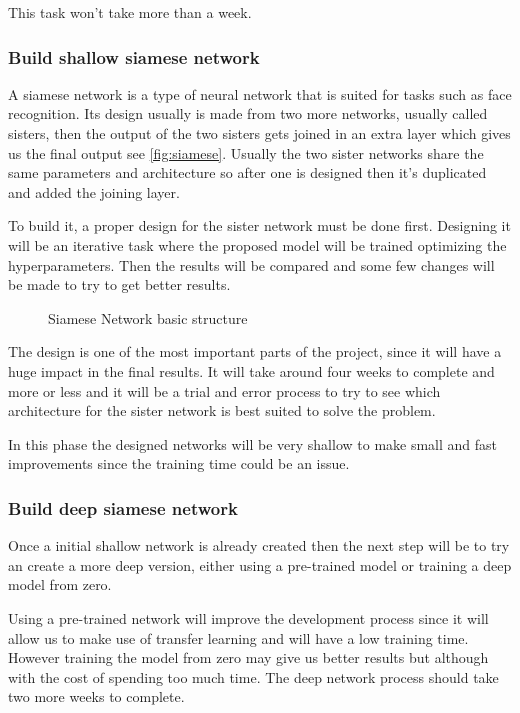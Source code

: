 This task won't take more than a week.

\subsubsection{Build shallow siamese network}

A siamese network is a type of neural network that is suited for tasks such as face recognition.
Its design usually is made from two more networks, usually called sisters, then the output
of the two sisters gets joined in an extra layer which gives us the final output 
see \autoref{fig:siamese}. Usually the two sister networks share the same parameters and
architecture so after one is designed then it's duplicated and added the joining layer.

To build it, a proper design for the sister network must be done first. Designing it will
be an iterative task where the proposed model will be trained optimizing the hyperparameters.
Then the results will be compared and some few changes will be made to try to get better results.

\begin{figure}
  \centering
  
  \caption{Siamese Network basic structure \label{fig:siamese}}
\end{figure}

The design is one of the most important parts of the project, since it will have a huge
impact in the final results. It will take around four weeks to complete and more or less
and it will be a trial and error process to try to see which architecture for the sister
network is best suited to solve the problem.

In this phase the designed networks will be very shallow to make small and fast improvements
since the training time could be an issue.

\subsubsection{Build deep siamese network}

Once a initial shallow network is already created then the next step will be to try an create
a more deep version, either using a pre-trained model or training a deep model from zero.

Using a pre-trained network will improve the development process since it will allow us
to make use of transfer learning and will have a low training time. However training the model
from zero may give us better results but although with the cost of spending too much time.
The deep network process should take two more weeks to complete.

